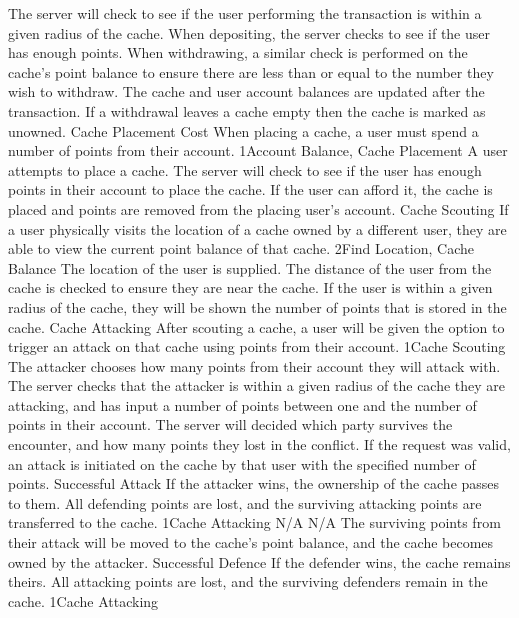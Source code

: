 			{The server will check to see if the user performing the transaction is within a given radius of the cache. When depositing, the server checks to see if the user has enough points. When withdrawing, a similar check is performed on the cache's point balance to ensure there are less than or equal to the number they wish to withdraw.}
			{The cache and user account balances are updated after the transaction. If a withdrawal leaves a cache empty then the cache is marked as unowned.}
		\funcreq
			{Cache Placement Cost}
			{When placing a cache, a user must spend a number of points from their account.}
			{1}{Account Balance, Cache Placement}
			{A user attempts to place a cache.}
			{The server will check to see if the user has enough points in their account to place the cache.}
			{If the user can afford it, the cache is placed and points are removed from the placing user's account.}
		\funcreq
			{Cache Scouting}
			{If a user physically visits the location of a cache owned by a different user, they are able to view the current point balance of that cache.}
			{2}{Find Location, Cache Balance}
			{The location of the user is supplied.}
			{The distance of the user from the cache is checked to ensure they are near the cache.}
			{If the user is within a given radius of the cache, they will be shown the number of points that is stored in the cache.}
		\funcreq
			{Cache Attacking}
			{After scouting a cache, a user will be given the option to trigger an attack on that cache using points from their account.}
			{1}{Cache Scouting}
			{The attacker chooses how many points from their account they will attack with.}
			{The server checks that the attacker is within a given radius of the cache they are attacking, and has input a number of points between one and the number of points in their account. The server will decided which party survives the encounter, and how many points they lost in the conflict.}
			{If the request was valid, an attack is initiated on the cache by that user with the specified number of points.}
		\funcreq
			{Successful Attack}
			{If the attacker wins, the ownership of the cache passes to them. All defending points are lost, and the surviving attacking points are transferred to the cache.}
			{1}{Cache Attacking}
			{N/A}
			{N/A}
			{The surviving points from their attack will be moved to the cache's point balance, and the cache becomes owned by the attacker.}
		\funcreq
			{Successful Defence}
			{If the defender wins, the cache remains theirs. All attacking points are lost, and the surviving defenders remain in the cache.}
			{1}{Cache Attacking}
